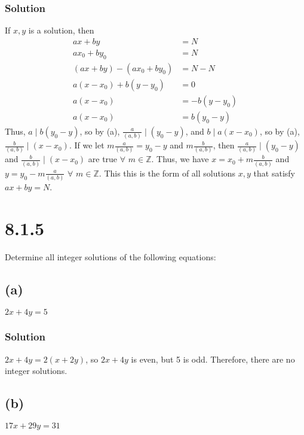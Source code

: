 \documentclass[fleqn]{article}
\begin{document}
            \subsubsection{Solution}
            If $x, y$ is a solution, then
            \begin{align}
                ax + by &= N \\
                ax_0 + by_0 &= N \\
                (ax + by) - (ax_0 + by_0) &= N - N \\
                a(x - x_0) + b(y - y_0) &= 0 \\
                a(x - x_0) &= -b(y - y_0) \\
                a(x - x_0) &= b(y_0 - y)
            \end{align}
            Thus, $a \mid b(y_0 - y)$, so by (a), $\frac{a}{(a, b) } \mid (y_0 - y)$, and $b \mid a(x - x_0)$, so by (a), $\frac{b}{(a, b)} \mid (x - x_0)$.  If we let $m \frac{a}{(a, b)} = y_0 - y$ and $m \frac{b}{(a, b)}$, then $\frac{a}{(a, b) } \mid (y_0 - y)$ and $\frac{b}{(a, b)} \mid (x - x_0)$ are true $\forall$ $m \in \mathbb{Z}$.  Thus, we have $x = x_0 + m \frac{b}{(a, b)}$ and $y = y_0 - m \frac{a}{(a, b)}$ $\forall$ $m \in \mathbb{Z}$.  This this is the form of all solutions $x, y$ that satisfy $ax + by = N$.
    
    \section{8.1.5}
    Determine all integer solutions of the following equations:
        
        \subsection{(a)}
        $2x + 4y = 5$
            
            \subsubsection{Solution}
            $2x + 4y = 2(x + 2y)$, so $2x + 4y$ is even, but 5 is odd.  Therefore, there are no integer solutions.
        
        \subsection{(b)}
        $17x + 29y = 31$
            
\end{document}
